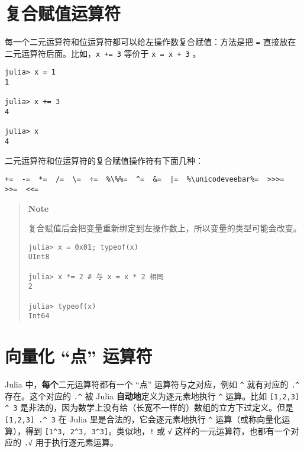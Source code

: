 \section{复合赋值运算符}



每一个二元运算符和位运算符都可以给左操作数复合赋值：方法是把 \texttt{=} 直接放在二元运算符后面。比如，\texttt{x += 3} 等价于 \texttt{x = x + 3} 。




\begin{verbatim}
julia> x = 1
1

julia> x += 3
4

julia> x
4
\end{verbatim}



二元运算符和位运算符的复合赋值操作符有下面几种：




\begin{lstlisting}[escapeinside=\%\%]
+=  -=  *=  /=  \=  ÷=  %\%%=  ^=  &=  |=  %\unicodeveebar%=  >>>=  >>=  <<=
\end{lstlisting}



\begin{quote}
\textbf{Note}

复合赋值后会把变量重新绑定到左操作数上，所以变量的类型可能会改变。


\begin{verbatim}
julia> x = 0x01; typeof(x)
UInt8

julia> x *= 2 # 与 x = x * 2 相同
2

julia> typeof(x)
Int64
\end{verbatim}

\end{quote}


\hypertarget{6173297391052343261}{}


\section{向量化 “点” 运算符}



Julia 中，\textbf{每个}二元运算符都有一个 “点” 运算符与之对应，例如 \texttt{{\textasciicircum}} 就有对应的 \texttt{.{\textasciicircum}} 存在。这个对应的 \texttt{.{\textasciicircum}} 被 Julia \textbf{自动地}定义为逐元素地执行 \texttt{{\textasciicircum}} 运算。比如 \texttt{[1,2,3] {\textasciicircum} 3} 是非法的，因为数学上没有给（长宽不一样的）数组的立方下过定义。但是 \texttt{[1,2,3] .{\textasciicircum} 3} 在 Julia 里是合法的，它会逐元素地执行 \texttt{{\textasciicircum}} 运算（或称向量化运算），得到 \texttt{[1{\textasciicircum}3, 2{\textasciicircum}3, 3{\textasciicircum}3]}。类似地，\texttt{!} 或 \texttt{√} 这样的一元运算符，也都有一个对应的 \texttt{.√} 用于执行逐元素运算。




